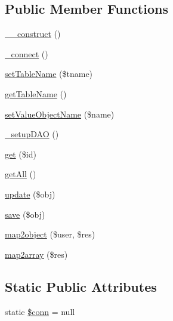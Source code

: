 \subsection*{Public Member Functions}
\begin{DoxyCompactItemize}
\item 
\hyperlink{class_sec_plus_1_1_abstract_model_a095c5d389db211932136b53f25f39685}{\_\-\_\-construct} ()
\item 
\hyperlink{class_sec_plus_1_1_abstract_model_a056510893d19074b6d9138db970a8843}{\_\-connect} ()
\item 
\hyperlink{class_sec_plus_1_1_abstract_model_aa4cdca551a2a89730dd30709efbb9b79}{setTableName} (\$tname)
\item 
\hyperlink{class_sec_plus_1_1_abstract_model_a93566f2c8d709d410ae8ec46b813999b}{getTableName} ()
\item 
\hyperlink{class_sec_plus_1_1_abstract_model_a8f13122998e0dca4db5a421836c2cfc7}{setValueObjectName} (\$name)
\item 
\hyperlink{class_sec_plus_1_1_abstract_model_a4445e53c2e78d3e01fc2880a62b2ef54}{\_\-setupDAO} ()
\item 
\hyperlink{class_sec_plus_1_1_abstract_model_a50e3bfb586b2f42932a6a93f3fbb0828}{get} (\$id)
\item 
\hyperlink{class_sec_plus_1_1_abstract_model_aba0d5b303383fb5b1fabb5fd01cd3800}{getAll} ()
\item 
\hyperlink{class_sec_plus_1_1_abstract_model_abe62d28c10800e8e62701357e5e1e84a}{update} (\$obj)
\item 
\hyperlink{class_sec_plus_1_1_abstract_model_ad5946f70036ad94a9b1b584fd7be7ae8}{save} (\$obj)
\item 
\hyperlink{class_sec_plus_1_1_abstract_model_acfd1dae1579fd97718fdfb087e438b05}{map2object} (\$user, \$res)
\item 
\hyperlink{class_sec_plus_1_1_abstract_model_a496de406779fbeb7b8b6695809b16271}{map2array} (\$res)
\end{DoxyCompactItemize}
\subsection*{Static Public Attributes}
\begin{DoxyCompactItemize}
\item 
static \hyperlink{class_sec_plus_1_1_abstract_model_aa8a5a87b9c1a6a0819b88447cbe41877}{\$conn} = null
\end{DoxyCompactItemize}
